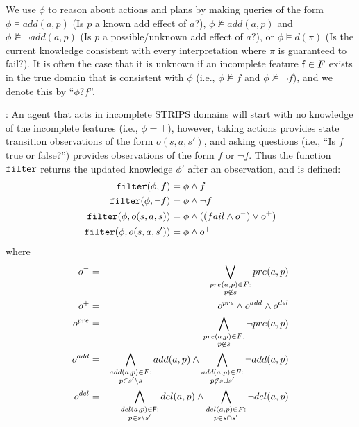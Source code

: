 \documentclass[letterpaper]{article}
\def\und#1{\noindent{\bf #1}:}
\begin{document}
We use $\phi$ to reason about actions and
plans by making queries of the form $\phi \models
add({a}, p)$ (Is $p$ a known add effect of
${a}$?), $\phi \not\models add({a}, p)$ and $\phi
\not \models \neg add({a}, p)$  (Is $p$ a
possible/unknown add effect of ${a}$?),  or $\phi \models d(\pi)$ (Is the
current knowledge consistent with every interpretation where $\pi$ is guaranteed
to fail?).  It is often the case that it is unknown if an incomplete feature
${\sf f} \in F$ exists in the true domain that is consistent with $\phi$ (i.e., $\phi \not\models f$ and $\phi \not\models
\neg f$), and we denote this by ``$\phi?f$''.



\und{Filtering Observations} An agent that acts in incomplete STRIPS domains
will start with no knowledge of the incomplete features (i.e., $\phi = \top$),
however, taking actions provides state transition observations of the form $o(s,
a, s')$, and asking questions (i.e., ``Is $f$ true or false?'') provides
observations of the form $f$ or $\neg f$.  Thus the function ${\tt filter}$
returns the updated knowledge $\phi'$ after an observation, and is
defined:
\begin{align*}
{\tt filter}(\phi, f) & = \phi \wedge f \\
{\tt filter}(\phi, \neg f) & = \phi \wedge \neg f \\
{\tt filter}(\phi, o(s, a, s)) & = \phi \wedge ((fail \wedge o^-) \vee  o^+)\\
{\tt filter}(\phi, o(s, a, s')) & = \phi \wedge  o^+
\end{align*}
 where 
\begin{eqnarray*}
o^- &=& \bigvee\limits_{\substack{pre({a},p) \in 
F:\\ p \not\in s} } pre({a},p) 
\label{eqn:update1} \\
o^+ &=& o^{pre} \wedge o^{add} \wedge o^{del}\label{eqn:update2}\\
o^{pre} &=& \bigwedge\limits_{\substack{pre({a},p)
 \in F:\\ p \not\in s} }\neg pre({a},p)
 \label{eqn:update3}  \\
o^{add} &=& \bigwedge\limits_{\substack{add({a},p) \in 
F:\\ p\in s'\backslash s} }add({a},p) 
  \wedge \bigwedge\limits_{\substack{add({a},p) \in 
  F: \\ p \not\in  s\cup s'}} \neg 
  add({a},p)   \label{eqn:update4}\\
o^{del} &=& 
\bigwedge\limits_{\substack{del({a},p) \in {\sf
F}: \\p \in s \backslash s'}}
del({a},p)  \wedge
\bigwedge\limits_{\substack{del({a},p)
\in F:\\ p \in s\cap s'}}\neg
del({a},p)  \label{eqn:update5}
\end{eqnarray*}
\end{document}
